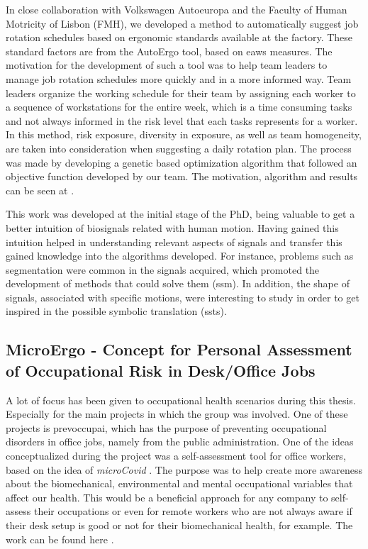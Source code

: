 In close collaboration with Volkswagen Autoeuropa and the Faculty of Human Motricity of Lisbon (FMH), we developed a method to automatically suggest job rotation schedules based on ergonomic standards available at the factory. These standard factors are from the AutoErgo tool, based on \gls{eaws} measures. The motivation for the development of such a tool was to help team leaders to manage job rotation schedules more quickly and in a more informed way. Team leaders organize the working schedule for their team by assigning each worker to a sequence of workstations for the entire week, which is a time consuming tasks and not always informed in the risk level that each tasks represents for a worker. In this method, risk exposure, diversity in exposure, as well as team homogeneity, are taken into consideration when suggesting a daily rotation plan. The process was made by developing a genetic based optimization algorithm that followed an objective function developed by our team. The motivation, algorithm and results can be seen at \cite{jobrotation1}.
\par
This work was developed at the initial stage of the PhD, being valuable to get a better intuition of biosignals related with human motion. Having gained this intuition helped in understanding relevant aspects of signals and transfer this gained knowledge into the algorithms developed. For instance, problems such as segmentation were common in the signals acquired, which promoted the development of methods that could solve them (\gls{ssm}). In addition, the shape of signals, associated with specific motions, were interesting to study in order to get inspired in the possible symbolic translation (\gls{ssts}).

\subsection{MicroErgo - Concept for Personal Assessment of Occupational Risk in Desk/Office Jobs}

A lot of focus has been given to occupational health scenarios during this thesis. Especially for the main projects in which the group was involved. One of these projects is \gls{prevoccupai}, which has the purpose of preventing occupational disorders in office jobs, namely from the public administration. One of the ideas conceptualized during the project was a self-assessment tool for office workers, based on the idea of \textit{microCovid} \cite{microcovid}. The purpose was to help create more awareness about the biomechanical, environmental and mental occupational variables that affect our health. This would be a beneficial approach for any company to self-assess their occupations or even for remote workers who are not always aware if their desk setup is good or not for their biomechanical health, for example. The work can be found here \cite{microergo}.

